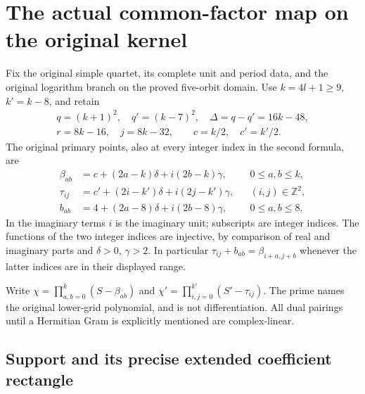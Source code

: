 \documentclass[11pt,a4paper]{article}
\begin{document}

\clearpage
\section{The actual common-factor map on the original kernel}
\label{sec:ACR}

Fix the original simple quartet, its complete unit and period data,
and the original logarithm branch on the proved five-orbit domain.
Use $k=4l+1\geq9$, $k'=k-8$, and retain
\[
 \begin{gathered}
 q=(k+1)^2,\quad q'=(k-7)^2,\quad
 \Delta=q-q'=16k-48,\\ r=8k-16,\quad j=8k-32,
 \qquad c=k/2,\quad c'=k'/2.
 \end{gathered}
 \tag{ACR1}
\]
The original primary points, also at every integer index in the
second formula, are
\[
 \begin{aligned}
 \beta_{ab}&=c+(2a-k)\delta+i(2b-k)\gamma,
                         &&0\leq a,b\leq k,\\
 \tau_{ij}&=c'+(2i-k')\delta+i(2j-k')\gamma,
                         &&(i,j)\in\mathbb Z^2,\\
 b_{ab}&=4+(2a-8)\delta+i(2b-8)\gamma,
                         &&0\leq a,b\leq8.
 \end{aligned}\tag{ACR2}
\]
In the imaginary terms $i$ is the imaginary unit; subscripts are
integer indices. The functions of the two integer indices are
injective, by comparison of real and imaginary parts and
$\delta>0$, $\gamma>2$. In particular
$\tau_{ij}+b_{ab}=\beta_{i+a,j+b}$ whenever the latter indices
are in their displayed range.

Write $\chi=\prod_{a,b=0}^k(S-\beta_{ab})$ and
$\chi'=\prod_{i,j=0}^{k'}(S'-\tau_{ij})$. The prime names
the original lower-grid polynomial, and is not differentiation.
All dual pairings until a Hermitian Gram is explicitly mentioned
are complex-linear.

\subsection{Support and its precise extended coefficient rectangle}
\end{document}
